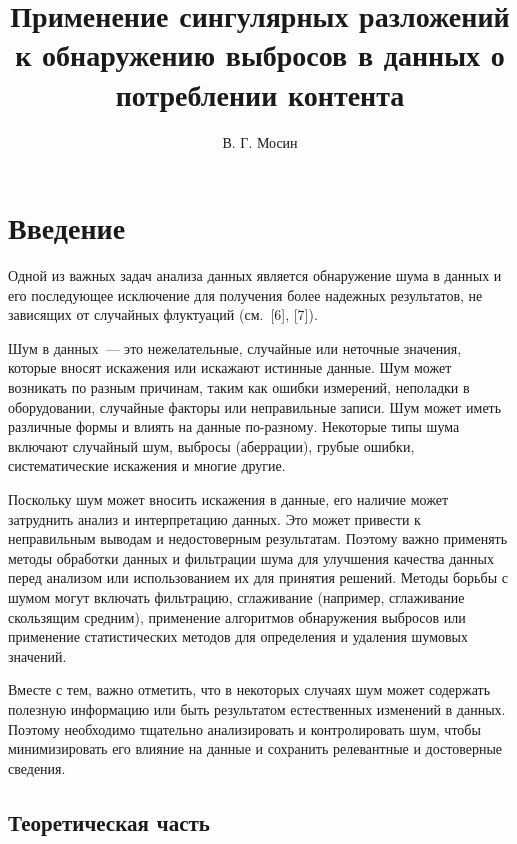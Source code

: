 \documentclass[a4paper,12pt]{article}
\title{Применение сингулярных разложений к обнаружению выбросов в данных о потреблении контента}
\author{В. Г. Мосин}
\date{}
\begin{document}
	\maketitle
	
\tableofcontents
	
\section{Введение}
Одной из важных задач анализа данных является обнаружение шума в данных и его последующее исключение для получения более надежных результатов, не зависящих от случайных флуктуаций (см. [6], [7]).

Шум в данных — это нежелательные, случайные или неточные значения, которые вносят искажения или искажают истинные данные. Шум может возникать по разным причинам, таким как ошибки измерений, неполадки в оборудовании, случайные факторы или неправильные записи. Шум может иметь различные формы и влиять на данные по-разному. Некоторые типы шума включают случайный шум, выбросы (аберрации), грубые ошибки, систематические искажения и многие другие. 

Поскольку шум может вносить искажения в данные, его наличие может затруднить анализ и интерпретацию данных. Это может привести к неправильным выводам и недостоверным результатам. Поэтому важно применять методы обработки данных и фильтрации шума для улучшения качества данных перед анализом или использованием их для принятия решений. Методы борьбы с шумом могут включать фильтрацию, сглаживание (например, сглаживание скользящим средним), применение алгоритмов обнаружения выбросов или применение статистических методов для определения и удаления шумовых значений. 

Вместе с тем, важно отметить, что в некоторых случаях шум может содержать полезную информацию или быть результатом естественных изменений в данных. Поэтому необходимо тщательно анализировать и контролировать шум, чтобы минимизировать его влияние на данные и сохранить релевантные и достоверные сведения.

\subsection{Теоретическая часть}
\end{document}

